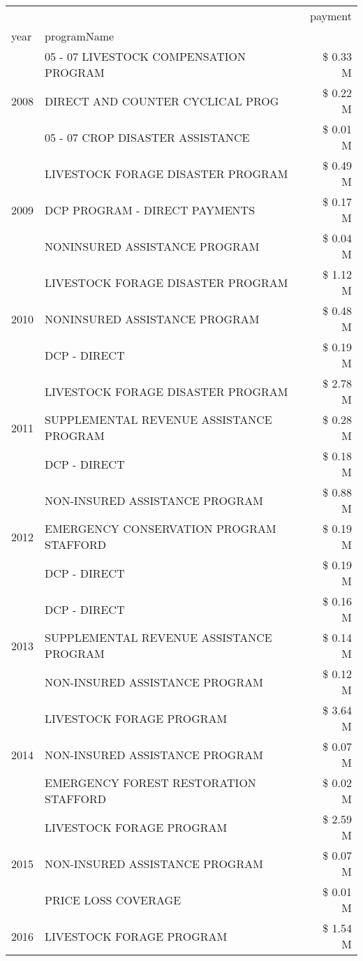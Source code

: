 \begin{tabular}{llr}
\toprule
 &  & payment \\
year & programName &  \\
\midrule
\multirow[t]{3}{*}{2008} & 05 - 07 LIVESTOCK COMPENSATION PROGRAM & \$ 0.33 M \\
 & DIRECT AND COUNTER CYCLICAL PROG & \$ 0.22 M \\
 & 05 - 07 CROP DISASTER ASSISTANCE & \$ 0.01 M \\
\cline{1-3}
\multirow[t]{3}{*}{2009} & LIVESTOCK FORAGE DISASTER  PROGRAM & \$ 0.49 M \\
 & DCP PROGRAM - DIRECT PAYMENTS & \$ 0.17 M \\
 & NONINSURED ASSISTANCE PROGRAM & \$ 0.04 M \\
\cline{1-3}
\multirow[t]{3}{*}{2010} & LIVESTOCK FORAGE DISASTER PROGRAM & \$ 1.12 M \\
 & NONINSURED ASSISTANCE PROGRAM & \$ 0.48 M \\
 & DCP - DIRECT & \$ 0.19 M \\
\cline{1-3}
\multirow[t]{3}{*}{2011} & LIVESTOCK FORAGE DISASTER PROGRAM & \$ 2.78 M \\
 & SUPPLEMENTAL REVENUE ASSISTANCE PROGRAM & \$ 0.28 M \\
 & DCP - DIRECT & \$ 0.18 M \\
\cline{1-3}
\multirow[t]{3}{*}{2012} & NON-INSURED ASSISTANCE PROGRAM & \$ 0.88 M \\
 & EMERGENCY CONSERVATION PROGRAM STAFFORD & \$ 0.19 M \\
 & DCP - DIRECT & \$ 0.19 M \\
\cline{1-3}
\multirow[t]{3}{*}{2013} & DCP - DIRECT & \$ 0.16 M \\
 & SUPPLEMENTAL REVENUE ASSISTANCE PROGRAM & \$ 0.14 M \\
 & NON-INSURED ASSISTANCE PROGRAM & \$ 0.12 M \\
\cline{1-3}
\multirow[t]{3}{*}{2014} & LIVESTOCK FORAGE PROGRAM & \$ 3.64 M \\
 & NON-INSURED ASSISTANCE PROGRAM & \$ 0.07 M \\
 & EMERGENCY FOREST RESTORATION STAFFORD & \$ 0.02 M \\
\cline{1-3}
\multirow[t]{3}{*}{2015} & LIVESTOCK FORAGE PROGRAM & \$ 2.59 M \\
 & NON-INSURED ASSISTANCE PROGRAM & \$ 0.07 M \\
 & PRICE LOSS COVERAGE & \$ 0.01 M \\
\cline{1-3}
\multirow[t]{3}{*}{2016} & LIVESTOCK FORAGE PROGRAM & \$ 1.54 M \\

\end{tabular}
